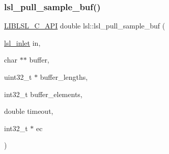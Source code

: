 \mbox{\label{namespacelsl_aeb6a1e871e465e4859292bc46a2e5bbd}} 
\subsubsection{\texorpdfstring{lsl\+\_\+pull\+\_\+sample\+\_\+buf()}{lsl\_pull\_sample\_buf()}}
{\footnotesize\ttfamily \hyperlink{lsl__cpp_8h_aafd0ef1813e8be84a1420c4f1df64615}{L\+I\+B\+L\+S\+L\+\_\+\+C\+\_\+\+A\+PI} double lsl\+::lsl\+\_\+pull\+\_\+sample\+\_\+buf (\begin{DoxyParamCaption}\item[{\hyperlink{namespacelsl_a884a3363cfcba75d7ce8f00c1c4c54f1}{lsl\+\_\+inlet}}]{in,  }\item[{char $\ast$$\ast$}]{buffer,  }\item[{uint32\+\_\+t $\ast$}]{buffer\+\_\+lengths,  }\item[{int32\+\_\+t}]{buffer\+\_\+elements,  }\item[{double}]{timeout,  }\item[{int32\+\_\+t $\ast$}]{ec }\end{DoxyParamCaption})}

